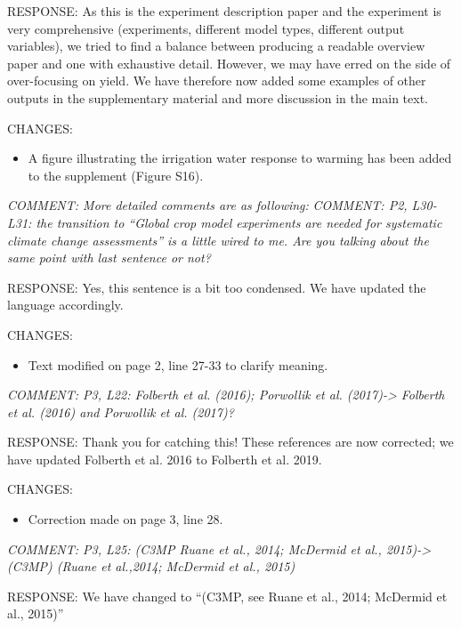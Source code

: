 \documentclass[gmd, manuscript]{copernicus} %
\begin{document}
RESPONSE: As this is the experiment description paper and the experiment is very comprehensive (experiments, different model types, different output variables), we tried to find a balance between producing a readable overview paper and one with exhaustive detail. However, we may have erred on the side of over-focusing on yield. We have therefore now added some examples of other outputs in the supplementary material and more discussion in the main text.
\smallskip

CHANGES:
\begin{itemize}
    \item A figure illustrating the irrigation water response to warming has been added to the supplement (Figure S16).
\end{itemize}

\smallskip

\textcolor{dark-gray}{\textit{COMMENT: More detailed comments are as following:}}
\textcolor{dark-gray}{\textit{COMMENT: P2, L30-L31: the transition to “Global crop model experiments are needed for systematic climate change assessments” is a little wired to me. Are you talking about the same point with last sentence or not?}}

RESPONSE: Yes, this sentence is a bit too condensed. We have updated the language accordingly. 
\smallskip

CHANGES:
\begin{itemize}
    \item Text modified on page 2, line 27-33 to clarify meaning.
\end{itemize}

\smallskip

\textcolor{dark-gray}{\textit{COMMENT: P3, L22: Folberth et al. (2016); Porwollik et al. (2017)-> Folberth et al. (2016) and Porwollik et al. (2017)?}}

RESPONSE: Thank you for catching this! These references are now corrected; we have updated Folberth et al. 2016 to Folberth et al. 2019.
\smallskip

CHANGES:
\begin{itemize}
    \item Correction made on page 3, line 28.
\end{itemize}

\smallskip

\textcolor{dark-gray}{\textit{COMMENT: P3, L25: (C3MP Ruane et al., 2014; McDermid et al., 2015)-> (C3MP) (Ruane et al.,2014; McDermid et al., 2015)}}

RESPONSE: We have changed to “(C3MP, see Ruane et al., 2014; McDermid et al., 2015)”
\smallskip
\end{document}
